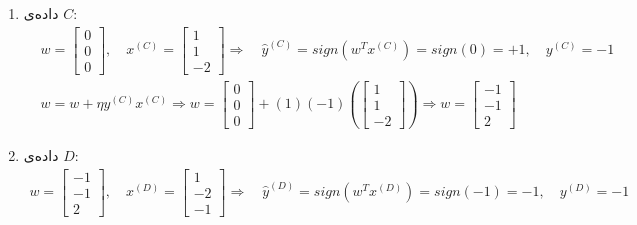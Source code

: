 \begin{ابجد}
\begin{enumerate}
    \item داده‌ی $C$:
          \begin{align*}
               & w = \begin{bmatrix} 0 \\ 0 \\ 0 \end{bmatrix}, \quad x^{(C)} = \begin{bmatrix} 1 \\ 1 \\ -2 \end{bmatrix} \Rightarrow \quad \hat{y}^{(C)} = sign(w^T x^{(C)}) = sign(0) = +1, \quad y^{(C)} = -1        \\
               & w = w + \eta y^{(C)}x^{(C)} \Rightarrow w = \begin{bmatrix} 0 \\ 0 \\ 0 \end{bmatrix} + (1)(-1)(\begin{bmatrix} 1 \\ 1 \\ -2 \end{bmatrix}) \Rightarrow w = \begin{bmatrix} -1 \\ -1 \\ 2 \end{bmatrix}
          \end{align*}

    \item داده‌ی $D$:
          \begin{align*}
              w = \begin{bmatrix} -1 \\ -1 \\ 2 \end{bmatrix}, \quad x^{(D)} = \begin{bmatrix} 1 \\ -2 \\ -1 \end{bmatrix} \Rightarrow \quad \hat{y}^{(D)} = sign(w^T x^{(D)}) = sign(-1) = -1, \quad y^{(D)} = -1
          \end{align*}

\end{enumerate}


\end{ابجد}
